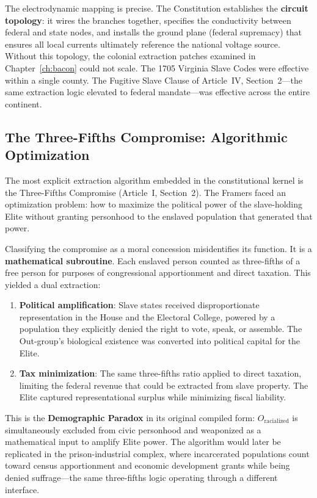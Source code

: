 The electrodynamic mapping is precise. The Constitution establishes the \textbf{circuit topology}: it wires the branches together, specifies the conductivity between federal and state nodes, and installs the ground plane (federal supremacy) that ensures all local currents ultimately reference the national voltage source. Without this topology, the colonial extraction patches examined in Chapter~\ref{ch:bacon} could not scale. The 1705 Virginia Slave Codes were effective within a single county. The Fugitive Slave Clause of Article~IV, Section~2---the same extraction logic elevated to federal mandate---was effective across the entire continent.

\subsection{The Three-Fifths Compromise: Algorithmic Optimization}

The most explicit extraction algorithm embedded in the constitutional kernel is the Three-Fifths Compromise (Article~I, Section~2). The Framers faced an optimization problem: how to maximize the political power of the slave-holding Elite without granting personhood to the enslaved population that generated that power.

Classifying the compromise as a moral concession misidentifies its function. It is a \textbf{mathematical subroutine}. Each enslaved person counted as three-fifths of a free person for purposes of congressional apportionment and direct taxation. This yielded a dual extraction:

\begin{enumerate}
    \item \textbf{Political amplification}: Slave states received disproportionate representation in the House and the Electoral College, powered by a population they explicitly denied the right to vote, speak, or assemble. The Out-group's biological existence was converted into political capital for the Elite.
    \item \textbf{Tax minimization}: The same three-fifths ratio applied to direct taxation, limiting the federal revenue that could be extracted from slave property. The Elite captured representational surplus while minimizing fiscal liability.
\end{enumerate}

This is the \textbf{Demographic Paradox} in its original compiled form: $O_{\text{racialized}}$ is simultaneously excluded from civic personhood and weaponized as a mathematical input to amplify Elite power. The algorithm would later be replicated in the prison-industrial complex, where incarcerated populations count toward census apportionment and economic development grants while being denied suffrage---the same three-fifths logic operating through a different interface.

